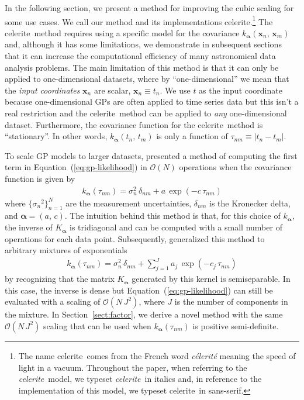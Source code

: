 \documentclass[manuscript, letterpaper]{aastex6}
\makeatletter
\let\origsection\section
\renewcommand\section{\@ifstar{\starsection}{\nostarsection}}
\newcommand\nostarsection[1]{\sectionprelude\origsection{#1}}
\newcommand\starsection[1]{\sectionprelude\origsection*{#1}}
\newcommand\sectionprelude{\vspace{1em}}
\newcommand{\project}[1]{\textsf{#1}}
\newcommand{\celerite}{\project{celerite}}
\newcommand{\celeriteterm}{\emph{celerite}}
\newcommand{\foreign}[1]{\emph{#1}}
\renewcommand{\eqref}[1]{\ref{eq:#1}}
\newcommand{\Eq}[1]{Equation~(\eqref{#1})}
\newcommand{\eq}[1]{\Eq{#1}}
\newcommand{\eqlabel}[1]{\label{eq:#1}}
\newcommand{\sectionname}{Section}
\newcommand{\sectref}[1]{\ref{sect:#1}}
\newcommand{\Sect}[1]{\sectionname~\sectref{#1}}
\newcommand{\sect}[1]{\Sect{#1}}
\newcommand{\sectlabel}[1]{\label{sect:#1}}
\newcommand{\bvec}[1]{{\ensuremath{\boldsymbol{#1}}}}
\newcommand{\response}[1]{{\color{blue}#1}}
\makeatother
\begin{document}
In the following section, we present a method for improving the cubic scaling
for some use cases.
We call our method and its implementations \celerite.\footnote{The name
\celerite\ comes from the French word \foreign{c\'elerit\'e} meaning the speed
of light in a vacuum.
\response{Throughout the paper, when referring to the \celeriteterm\ model, we
typeset \celeriteterm\ in italics and, in reference to the implementation of
this model, we typeset \celerite\ in sans-serif.}}
The \celerite\ method requires using a specific model
for the covariance $k_\bvec{\alpha}(\bvec{x}_n,\,\bvec{x}_m)$ and, although it
has some limitations, we demonstrate in subsequent sections that it can
increase the computational efficiency of many astronomical data analysis
problems.
The main limitation of this method is that it can only be applied to
one-dimensional datasets, where by ``one-dimensional'' we mean that the
 \emph{input coordinates} $\bvec{x}_n$ are scalar, $\bvec{x}_n \equiv
t_n$.
We use $t$ as the input coordinate because one-dimensional GPs are often
applied to time series data but this isn't a real restriction and the
\celerite\ method can be applied to \emph{any} one-dimensional dataset.
Furthermore, the covariance function for the \celerite\ method is
``stationary''.
In other words, $k_\bvec{\alpha}(t_n,\,t_m)$ is only a function of $\tau_{nm}
\equiv |t_n - t_m|$.


\section{The celerite model}\sectlabel{celerite}

To scale GP models to larger datasets, \citet{Rybicki:1995} presented a method
of computing the first term in \eq{gp-likelihood} in $\mathcal{O}(N)$
operations when the covariance function is given by
\begin{eqnarray}\eqlabel{kernel-simple}
k_\bvec{\alpha}(\tau_{nm}) = \sigma_n^2\,\delta_{nm} + a\,\exp(-c\,\tau_{nm})
\end{eqnarray}
where $\{{\sigma_n}^2\}_{n=1}^N$ are the measurement uncertainties,
$\delta_{nm}$ is the Kronecker delta, and $\bvec{\alpha} = (a,\,c)$.
The intuition behind this method is that, for this choice of $k_\bvec{\alpha}$,
the inverse of $K_\bvec{\alpha}$ is tridiagonal and can be computed
with a small number of operations for each data point.
Subsequently, \citet{Ambikasaran:2015} generalized this method to arbitrary
mixtures of exponentials
\begin{eqnarray}
k_\bvec{\alpha}(\tau_{nm}) = \sigma_n^2\,\delta_{nm} +
    \sum_{j=1}^J a_j\,\exp(-c_j\,\tau_{nm})
\end{eqnarray}
\response{by recognizing that the matrix $K_\bvec{\alpha}$ generated by this
kernel is semiseparable.}
In this case, the inverse is dense but \eq{gp-likelihood} can still be
evaluated with a scaling of $\mathcal{O}(N\,J^2)$, where $J$ is the number of
components in the mixture.
\response{In \sect{factor}, we derive a novel method with the same
$\mathcal{O}(N\,J^2)$ scaling that can be used when
$k_\bvec{\alpha}(\tau_{nm})$ is positive semi-definite.}
\end{document}
